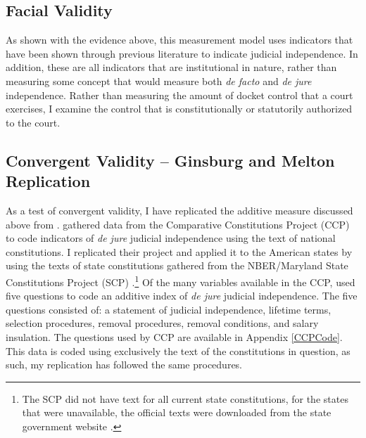\documentclass[JohnsonMADraft3.tex]{subfiles}
\begin{document}
\doublespacing

\subsection{Facial Validity}
As shown with the evidence above, this measurement model uses indicators that have been shown through previous literature to indicate judicial independence. In addition, these are all indicators that are institutional in nature, rather than measuring some concept that would measure both \textit{de facto} and \textit{de jure} independence. Rather than measuring the amount of docket control that a court exercises, I examine the control that is constitutionally or statutorily authorized to the court.


\subsection{Convergent Validity -- Ginsburg and Melton Replication}
As a test of convergent validity, I have replicated the additive measure discussed above from \citet{Melton2014}.  \citet{Melton2014} gathered data from the Comparative Constitutions Project (CCP) to code indicators of \textit{de jure} judicial independence using the text of national constitutions.  I replicated their project and applied it to the American states by using the texts of state constitutions gathered from the NBER/Maryland State Constitutions Project (SCP) \citep{Wallisnber}.\footnote{The SCP did not have text for all current state constitutions, for the states that were unavailable, the official texts were downloaded from the state government website \citep{Wallisnber}.}  Of the many variables available in the CCP, \citet{Melton2014} used five questions to code an additive index of \textit{de jure} judicial independence.  The five questions consisted of: a statement of judicial independence, lifetime terms, selection procedures, removal procedures, removal conditions, and salary insulation.  The questions used by CCP are available in Appendix \ref{CCPCode}.  This data is coded using exclusively the text of the constitutions in question, as such, my replication has followed the same procedures.

	
\end{document}
